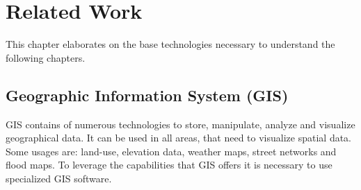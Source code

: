 
\chapter{Related Work}
This chapter elaborates on the base technologies necessary to understand the following chapters.



\section{Geographic Information System (GIS)}
GIS contains of numerous technologies to store, manipulate, analyze and visualize geographical data. It can be used in all areas, that need to visualize spatial data. Some usages are: land-use, elevation data, weather maps, street networks and flood maps. To leverage the capabilities that GIS offers it is necessary to use specialized GIS software.


